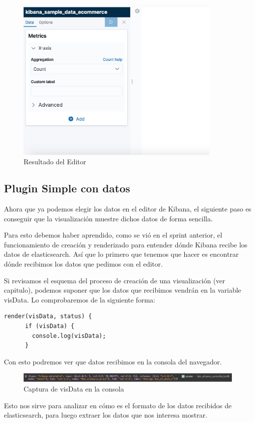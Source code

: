 \documentclass[a4paper, 12pt]{book}
\begin{document}
\begin{figure}[H]
  \centering
  \includegraphics[width=10cm, keepaspectratio]{img/development/editor-resultado.png}
  \caption{Resultado del Editor}
  \label{fig:editor}
\end{figure}

\subsection{Plugin Simple con datos}
Ahora que ya podemos elegir los datos en el editor de Kibana, el siguiente paso es conseguir que la visualización muestre dichos datos de forma sencilla.

Para esto debemos haber aprendido, como se vió en el sprint anterior, el funcionamiento de creación y renderizado para entender dónde Kibana recibe los datos de elasticsearch. Así que lo primero que tenemos que hacer es encontrar dónde recibimos los datos que pedimos con el editor.

Si revisamos el esquema del proceso de creación de una visualización (ver capitulo), podemos suponer que los datos que recibimos vendrán en la variable visData. Lo comprobaremos de la siguiente forma:

\begin{lstlisting}[frame=single]
  render(visData, status) {
      if (visData) {
        console.log(visData);
      }
\end{lstlisting}

Con esto podremos ver que datos recibimos en la consola del navegador.

\begin{figure}[H]
  \centering
  \includegraphics[width=16cm, keepaspectratio]{img/development/captura-visData.png}
  \caption{Captura de visData en la consola}
  \label{fig:visData}
\end{figure}
Esto nos sirve para analizar en cómo es el formato de los datos recibidos de elasticsearch, para luego extraer los datos que nos interesa mostrar. 
\end{document}
